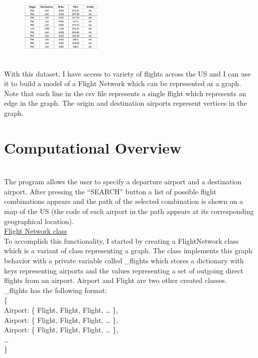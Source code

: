 \documentclass[fontsize=11pt]{article}
\begin{document}
\begin{figure}
    \includegraphics[width=0.35\textwidth]{table2.jpg}
\end{figure} \\

\noindent
With this dataset, I have access to variety of flights across the US and I can use it to build a model of a Flight Network which can be represented as a graph. Note that each line in the csv file represents a single flight which represents an edge in the graph. The origin and destination airports represent vertices in the graph.\\

\section*{Computational Overview}\\

\noindent
The program allows the user to specify a departure airport and a destination airport. After pressing the “SEARCH” button a list of possible flight combinations appears and the path of the selected combination is shown on a map of the US (the code of each airport in the path appears at its corresponding geographical location).\\

\noindent
\underline{Flight Network class}\\

\noindent
To accomplish this functionality, I started by creating a FlightNetwork class which is a variant of class representing a graph. The class implements this graph behavior with a private variable called \_flights which stores a dictionary with keys representing airports and the values representing a set of outgoing direct flights from an airport. Airport and Flight are two other created classes.\\

\noindent
\_flights has the following format:\\

\noindent
\{\\
\indent
Airport: \{ Flight, Flight, Flight, … \},\\
\indent
Airport: \{ Flight, Flight, Flight, … \},\\
\indent
Airport: \{ Flight, Flight, Flight, … \},\\
\indent
…\\
\}\\
\end{document}
